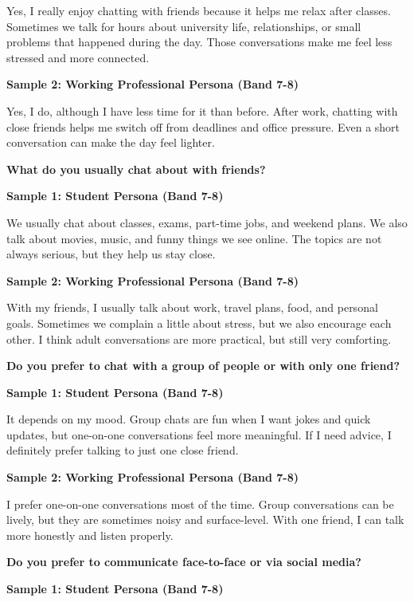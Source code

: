 Yes, I really enjoy chatting with friends because it helps me relax after classes. Sometimes we talk for hours about university life, relationships, or small problems that happened during the day. Those conversations make me feel less stressed and more connected.

\textbf{Sample 2: Working Professional Persona (Band 7-8)}

Yes, I do, although I have less time for it than before. After work, chatting with close friends helps me switch off from deadlines and office pressure. Even a short conversation can make the day feel lighter.

\separator

\begin{ieltsquestion}
\textbf{What do you usually chat about with friends?}
\end{ieltsquestion}
\textbf{Sample 1: Student Persona (Band 7-8)}

We usually chat about classes, exams, part-time jobs, and weekend plans. We also talk about movies, music, and funny things we see online. The topics are not always serious, but they help us stay close.

\textbf{Sample 2: Working Professional Persona (Band 7-8)}

With my friends, I usually talk about work, travel plans, food, and personal goals. Sometimes we complain a little about stress, but we also encourage each other. I think adult conversations are more practical, but still very comforting.

\separator

\begin{ieltsquestion}
\textbf{Do you prefer to chat with a group of people or with only one friend?}
\end{ieltsquestion}
\textbf{Sample 1: Student Persona (Band 7-8)}

It depends on my mood. Group chats are fun when I want jokes and quick updates, but one-on-one conversations feel more meaningful. If I need advice, I definitely prefer talking to just one close friend.

\textbf{Sample 2: Working Professional Persona (Band 7-8)}

I prefer one-on-one conversations most of the time. Group conversations can be lively, but they are sometimes noisy and surface-level. With one friend, I can talk more honestly and listen properly.

\separator

\begin{ieltsquestion}
\textbf{Do you prefer to communicate face-to-face or via social media?}
\end{ieltsquestion}
\textbf{Sample 1: Student Persona (Band 7-8)}

